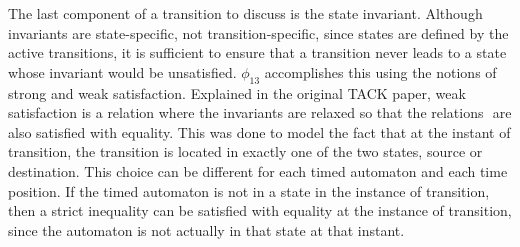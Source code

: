 \documentclass[a4paper,12pt]{article}
\begin{document}
The last component of a transition to discuss is the state invariant. Although
invariants are state-specific, not transition-specific, since states are defined
by the active transitions, it is sufficient to ensure that a transition never
leads to a state whose invariant would be unsatisfied. \(\phi_{13}\)
accomplishes this using the notions of strong and weak satisfaction. Explained
in the original TACK paper, weak satisfaction is a relation where the invariants
are relaxed so that the relations \(<,>\) are also satisfied with equality. This
was done to model the fact that at the instant of transition, the transition is
located in exactly one of the two states, source or destination. This choice can
be different for each timed automaton and each time position. If the timed
automaton is not in a state in the instance of transition, then a strict
inequality can be satisfied with equality at the instance of transition, since
the automaton is not actually in that state at that instant.
\end{document}
